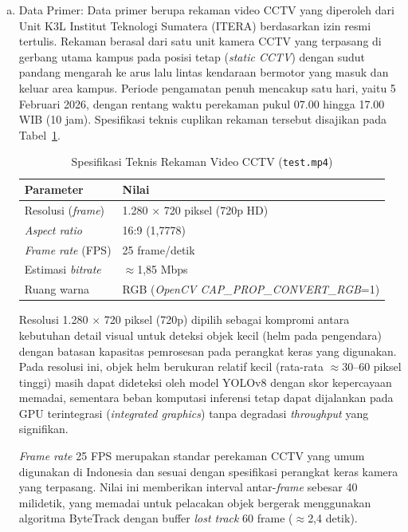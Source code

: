\begin{enumerate}[a.]
  \item Data Primer:
  Data primer berupa rekaman video CCTV yang diperoleh dari Unit K3L Institut Teknologi Sumatera (ITERA) berdasarkan izin resmi tertulis. Rekaman berasal dari satu unit kamera CCTV yang terpasang di gerbang utama kampus pada posisi tetap (\textit{static CCTV}) dengan sudut pandang mengarah ke arus lalu lintas kendaraan bermotor yang masuk dan keluar area kampus. Periode pengamatan penuh mencakup satu hari, yaitu 5 Februari 2026, dengan rentang waktu perekaman pukul 07.00 hingga 17.00 WIB (10 jam). Spesifikasi teknis cuplikan rekaman tersebut disajikan pada Tabel~\ref{tab:metadata-video}.
 
  \begin{table}[htpb]
    \centering
    \caption{Spesifikasi Teknis Rekaman Video CCTV (\texttt{test.mp4})}
    \label{tab:metadata-video}
    \begin{tabular}{p{} p{}}
      \toprule
      \textbf{Parameter} & \textbf{Nilai} \\
      \midrule
      Resolusi (\textit{frame}) & 1.280 $\times$ 720 piksel (720p HD) \\
      \textit{Aspect ratio} & 16:9 (1,7778) \\
      \textit{Frame rate} (FPS) & 25 frame/detik \\
      Estimasi \textit{bitrate} & $\approx$1,85 Mbps \\
      Ruang warna & RGB (\textit{OpenCV CAP\_PROP\_CONVERT\_RGB}=1) \\
      \bottomrule
    \end{tabular}
  \end{table}
 
  
 
  Resolusi 1.280 $\times$ 720 piksel (720p) dipilih sebagai kompromi antara kebutuhan detail visual untuk deteksi objek kecil (helm pada pengendara) dengan batasan kapasitas pemrosesan pada perangkat keras yang digunakan. Pada resolusi ini, objek helm berukuran relatif kecil (rata-rata $\approx$30--60 piksel tinggi) masih dapat dideteksi oleh model YOLOv8 dengan skor kepercayaan memadai, sementara beban komputasi inferensi tetap dapat dijalankan pada GPU terintegrasi (\textit{integrated graphics}) tanpa degradasi \textit{throughput} yang signifikan.
 
  \textit{Frame rate} 25 FPS merupakan standar perekaman CCTV yang umum digunakan di Indonesia dan sesuai dengan spesifikasi perangkat keras kamera yang terpasang. Nilai ini memberikan interval antar-\textit{frame} sebesar 40 milidetik, yang memadai untuk pelacakan objek bergerak menggunakan algoritma ByteTrack dengan buffer \textit{lost track} 60 frame ($\approx$2,4 detik).
 

\end{enumerate}
